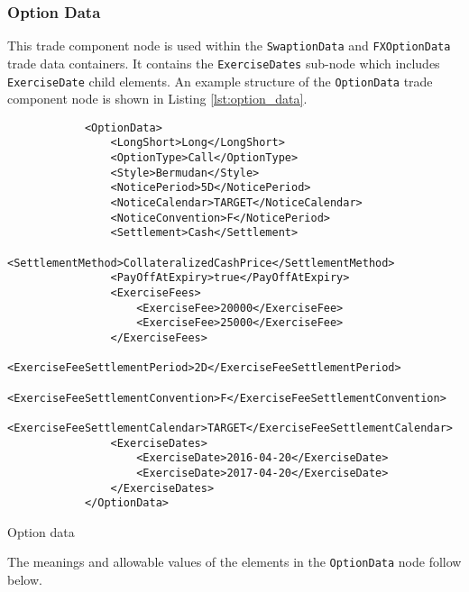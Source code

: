 \subsubsection{Option Data}
\label{ss:option_data} 
This trade component node is used within the \lstinline!SwaptionData! and \lstinline!FXOptionData! trade data
containers. It contains the \lstinline!ExerciseDates! sub-node which includes \lstinline!ExerciseDate! child
elements. An example structure of the \lstinline!OptionData! trade component node is shown in Listing
\ref{lst:option_data}.

\begin{listing}[H]
\begin{verbatim}
            <OptionData>
                <LongShort>Long</LongShort>
                <OptionType>Call</OptionType>
                <Style>Bermudan</Style>
                <NoticePeriod>5D</NoticePeriod>
                <NoticeCalendar>TARGET</NoticeCalendar>
                <NoticeConvention>F</NoticePeriod>
                <Settlement>Cash</Settlement>
                <SettlementMethod>CollateralizedCashPrice</SettlementMethod>
                <PayOffAtExpiry>true</PayOffAtExpiry>
                <ExerciseFees>
                    <ExerciseFee>20000</ExerciseFee>
                    <ExerciseFee>25000</ExerciseFee>
                </ExerciseFees>
                <ExerciseFeeSettlementPeriod>2D</ExerciseFeeSettlementPeriod>
                <ExerciseFeeSettlementConvention>F</ExerciseFeeSettlementConvention>
                <ExerciseFeeSettlementCalendar>TARGET</ExerciseFeeSettlementCalendar>
                <ExerciseDates>
                    <ExerciseDate>2016-04-20</ExerciseDate>
                    <ExerciseDate>2017-04-20</ExerciseDate>
                </ExerciseDates>
            </OptionData>
\end{verbatim}
\caption{Option data}
\label{lst:option_data}
\end{listing}

The meanings and allowable values of the elements in the \lstinline!OptionData! node follow below.

